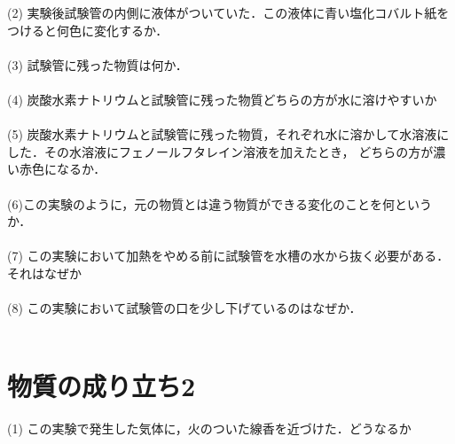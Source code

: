 \documentclass[autodetect-engine,dvi=dvipdfmx,ja=standard,
               a4j,11pt]{bxjsarticle}
\begin{document}
    (2) 実験後試験管の内側に液体がついていた．この液体に青い塩化コバルト紙をつけると何色に変化するか．\\\\

    (3) 試験管に残った物質は何か．\\\\

    (4) 炭酸水素ナトリウムと試験管に残った物質どちらの方が水に溶けやすいか\\\\

    (5) 炭酸水素ナトリウムと試験管に残った物質，それぞれ水に溶かして水溶液にした．その水溶液にフェノールフタレイン溶液を加えたとき，
    どちらの方が濃い赤色になるか．\\\\

    (6)この実験のように，元の物質とは違う物質ができる変化のことを何というか．\\\\

    (7) この実験において加熱をやめる前に試験管を水槽の水から抜く必要がある．それはなぜか\\\\

    (8) この実験において試験管の口を少し下げているのはなぜか．\\\\

    \clearpage
\section{物質の成り立ち2}
\begin{figure}[htb]
        \centering
        \vspace{20pt} %
        \caption{}
\end{figure}
    (1) この実験で発生した気体に，火のついた線香を近づけた．どうなるか\\\\
\end{document}
